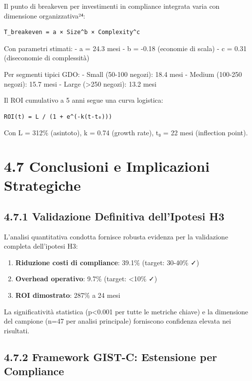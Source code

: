 \documentclass[12pt,a4paper,oneside]{book}
\providecommand{\tightlist}{%
  \setlength{\itemsep}{0pt}\setlength{\parskip}{0pt}
}
\numberwithin{figure}{chapter} %
\numberwithin{table}{chapter}  %
\begin{document}
Il punto di breakeven per investimenti in compliance integrata varia con
dimensione organizzativa²⁴:

\begin{verbatim}
T_breakeven = a × Size^b × Complexity^c
\end{verbatim}

Con parametri stimati: - a = 24.3 mesi - b = -0.18 (economie di scala) -
c = 0.31 (diseconomie di complessità)

Per segmenti tipici GDO: - Small (50-100 negozi): 18.4 mesi - Medium
(100-250 negozi): 15.7 mesi - Large (\textgreater250 negozi): 13.2 mesi

Il ROI cumulativo a 5 anni segue una curva logistica:

\begin{verbatim}
ROI(t) = L / (1 + e^(-k(t-t₀)))
\end{verbatim}

Con L = 312\% (asintoto), k = 0.74 (growth rate), t₀ = 22 mesi
(inflection point).

\section{4.7 Conclusioni e Implicazioni
Strategiche}\label{conclusioni-e-implicazioni-strategiche}

\subsection{4.7.1 Validazione Definitiva dell'Ipotesi
H3}\label{validazione-definitiva-dellipotesi-h3}

L'analisi quantitativa condotta fornisce robusta evidenza per la
validazione completa dell'ipotesi H3:

\begin{enumerate}
\def\labelenumi{\arabic{enumi}.}
\tightlist
\item
  \textbf{Riduzione costi di compliance}: 39.1\% (target: 30-40\% ✓)
\item
  \textbf{Overhead operativo}: 9.7\% (target: \textless10\% ✓)
\item
  \textbf{ROI dimostrato}: 287\% a 24 mesi
\end{enumerate}

La significatività statistica (p\textless0.001 per tutte le metriche
chiave) e la dimensione del campione (n=47 per analisi principale)
forniscono confidenza elevata nei risultati.

\subsection{4.7.2 Framework GIST-C: Estensione per
Compliance}\label{framework-gist-c-estensione-per-compliance}
\end{document}
